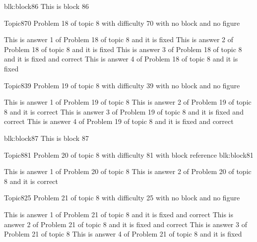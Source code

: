 \documentclass[master]{exam}
\begin{document}
\begin{block}{blk:block86}
This is block 86
\end{block}


\begin{problem}{Topic8}{70}
	Problem 18 of topic 8 with difficulty 70 with no block and no figure
	\begin{answers}
		\answer[fixed] This is answer 1 of Problem 18 of topic 8 and it is fixed
		\answer[fixed] This is answer 2 of Problem 18 of topic 8 and it is fixed
		 This is answer 3 of Problem 18 of topic 8 and it is fixed and correct
		\answer[fixed] This is answer 4 of Problem 18 of topic 8 and it is fixed
	\end{answers}
\end{problem}

\begin{problem}{Topic8}{39}
	Problem 19 of topic 8 with difficulty 39 with no block and no figure
	\begin{answers}
		\answer This is answer 1 of Problem 19 of topic 8 
		\answer[correct] This is answer 2 of Problem 19 of topic 8 and it is correct
		 This is answer 3 of Problem 19 of topic 8 and it is fixed and correct
		 This is answer 4 of Problem 19 of topic 8 and it is fixed and correct
	\end{answers}
\end{problem}



\begin{block}{blk:block87}
This is block 87
\end{block}


\begin{problem}[requires=blk:block81]{Topic8}{81}
	Problem 20 of topic 8 with difficulty 81 with block reference blk:block81
	\begin{answers}
		\answer This is answer 1 of Problem 20 of topic 8 
		\answer[correct] This is answer 2 of Problem 20 of topic 8 and it is correct
	\end{answers}
\end{problem}

\begin{problem}{Topic8}{25}
	Problem 21 of topic 8 with difficulty 25 with no block and no figure
	\begin{answers}
		 This is answer 1 of Problem 21 of topic 8 and it is fixed and correct
		 This is answer 2 of Problem 21 of topic 8 and it is fixed and correct
		\answer This is answer 3 of Problem 21 of topic 8 
		\answer[fixed] This is answer 4 of Problem 21 of topic 8 and it is fixed
	\end{answers}
\end{problem}
\end{document}
